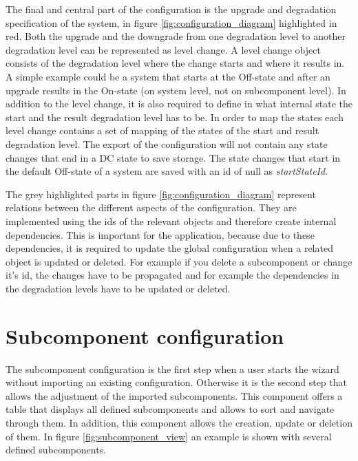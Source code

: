 The final and central part of the configuration is the upgrade and degradation specification of the system, in figure \ref{fig:configuration_diagram} highlighted in red. Both the upgrade and the downgrade from one degradation level to another degradation level can be represented as level change. A level change object consists of the degradation level where the change starts and where it results in. A simple example could be a system that starts at the Off-state and after an upgrade results in the On-state (on system level, not on subcomponent level). In addition to the level change, it is also required to define in what internal state the start and the result degradation level has to be. In order to map the states each level change contains a set of mapping of the states of the start and result degradation level. The export of the configuration will not contain any state changes that end in a DC state to save storage. The state changes that start in the default Off-state of a system are saved with an id of null as \textit{startStateId}.

The grey highlighted parts in figure \ref{fig:configuration_diagram} represent relations between the different aspects of the configuration. They are implemented using the ids of the relevant objects and therefore create internal dependencies. This is important for the application, because due to these dependencies, it is required to update the global configuration when a related object is updated or deleted. For example if you delete a subcomponent or change it's id, the changes have to be propagated and for example the dependencies in the degradation levels have to be updated or deleted.

\section{Subcomponent configuration}

The subcomponent configuration is the first step when a user starts the wizard without importing an existing configuration. Otherwise it is the second step that allows the adjustment of the imported subcomponents.
This component offers a table that displays all defined subcomponents and allows to sort and navigate through them. In addition, this component allows the creation, update or deletion of them. In figure \ref{fig:subcomponent_view} an example is shown with several defined subcomponents.

